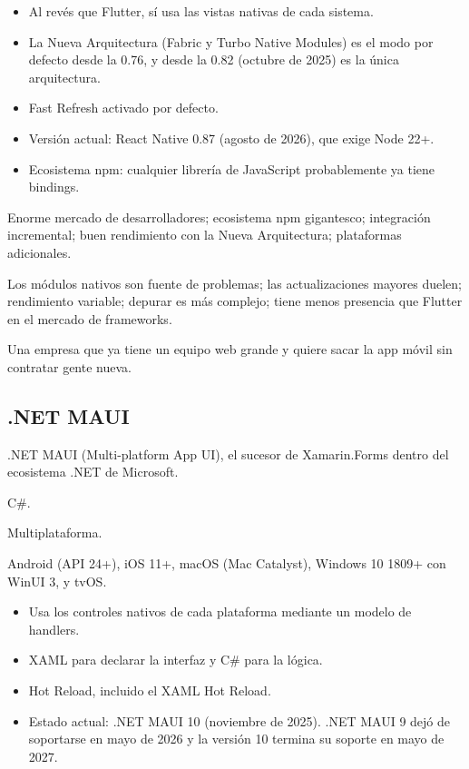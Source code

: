 \begin{itemize}[leftmargin=*,itemsep=0.2em,topsep=0.2em]
  \item Al revés que Flutter, sí usa las vistas nativas de cada sistema.
  \item La Nueva Arquitectura (Fabric y Turbo Native Modules) es el modo por defecto desde la 0.76, y desde la 0.82 (octubre de 2025) es la única arquitectura.
  \item Fast Refresh activado por defecto.
  \item Versión actual: React Native 0.87 (agosto de 2026), que exige Node 22+.
  \item Ecosistema npm: cualquier librería de JavaScript probablemente ya tiene bindings.
\end{itemize}

 Enorme mercado de desarrolladores; ecosistema npm gigantesco; integración incremental; buen rendimiento con la Nueva Arquitectura; plataformas adicionales.

 Los módulos nativos son fuente de problemas; las actualizaciones mayores duelen; rendimiento variable; depurar es más complejo; tiene menos presencia que Flutter en el mercado de frameworks.

 Una empresa que ya tiene un equipo web grande y quiere sacar la app móvil sin contratar gente nueva.

\subsection{.NET MAUI}

 .NET MAUI (Multi-platform App UI), el sucesor de Xamarin.Forms dentro del ecosistema .NET de Microsoft.

 C\#.

 Multiplataforma.

 Android (API 24+), iOS 11+, macOS (Mac Catalyst), Windows 10 1809+ con WinUI 3, y tvOS.

\begin{itemize}[leftmargin=*,itemsep=0.2em,topsep=0.2em]
  \item Usa los controles nativos de cada plataforma mediante un modelo de handlers.
  \item XAML para declarar la interfaz y C\# para la lógica.
  \item Hot Reload, incluido el XAML Hot Reload.
  \item Estado actual: .NET MAUI 10 (noviembre de 2025). .NET MAUI 9 dejó de soportarse en mayo de 2026 y la versión 10 termina su soporte en mayo de 2027.
\end{itemize}

